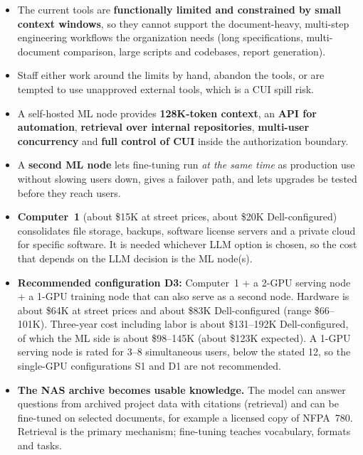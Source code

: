 
\begin{itemize}
  \item The current tools are \textbf{functionally limited and constrained by small
    context windows}, so they cannot support the document-heavy, multi-step
    engineering workflows the organization needs (long specifications,
    multi-document comparison, large scripts and codebases, report generation).
  \item Staff either work around the limits by hand, abandon the tools, or are
    tempted to use unapproved external tools, which is a CUI spill risk.
  \item A self-hosted ML node provides \textbf{128K-token context}, an \textbf{API for
    automation}, \textbf{retrieval over internal repositories}, \textbf{multi-user
    concurrency} and \textbf{full control of CUI} inside the authorization boundary.
  \item A \textbf{second ML node} lets fine-tuning run \emph{at the same time} as
    production use without slowing users down, gives a failover path, and lets
    upgrades be tested before they reach users.
  \item \textbf{Computer~1} (about \$15K at street prices, about \$20K Dell-configured)
    consolidates file storage, backups,
    software license servers and a private cloud for specific software. It is needed
    whichever LLM option is chosen, so the cost that depends on the LLM decision is
    the ML node(s).
  \item \textbf{Recommended configuration D3:} Computer~1 + a 2-GPU serving node + a
    1-GPU training node that can also serve as a second node. Hardware is about \$64K at
    street prices and about \$83K Dell-configured (range \$66--101K). Three-year cost
    including labor is about \$131--192K Dell-configured, of which the ML side is about
    \$98--145K (about \$123K expected). A 1-GPU serving node is rated for 3--8
    simultaneous users, below the stated 12, so the single-GPU configurations S1 and D1
    are not recommended.
  \item \textbf{The NAS archive becomes usable knowledge.} The model can answer questions
    from archived project data with citations (retrieval) and can be fine-tuned on
    selected documents, for example a licensed copy of NFPA~780. Retrieval is the primary
    mechanism; fine-tuning teaches vocabulary, formats and tasks.

\end{itemize}
